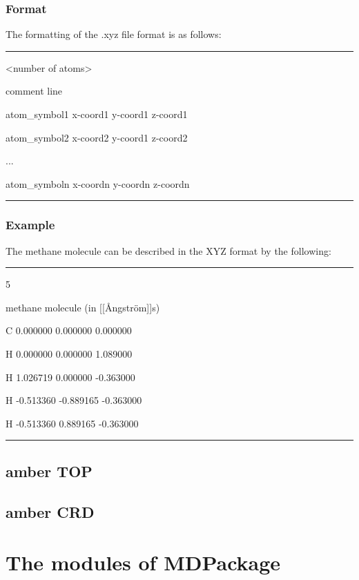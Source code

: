 \documentclass[letterpaper,10pt,english]{sphinxmanual}
\begin{document}
\subsection{Format}
\label{documentation_pages/file_format:format}
The formatting of the .xyz file format is as follows:


\bigskip\hrule{}\bigskip


\textless{}number of atoms\textgreater{}

comment line

atom\_symbol1 x-coord1 y-coord1 z-coord1

atom\_symbol2 x-coord2 y-coord1 z-coord2

...

atom\_symboln x-coordn y-coordn z-coordn


\bigskip\hrule{}\bigskip



\subsection{Example}
\label{documentation_pages/file_format:example}
The methane molecule can be described in the XYZ format by the following:


\bigskip\hrule{}\bigskip


5

methane molecule (in {[}{[}Ångström{]}{]}s)

C        0.000000        0.000000        0.000000

H        0.000000        0.000000        1.089000

H        1.026719        0.000000       -0.363000

H       -0.513360       -0.889165       -0.363000

H       -0.513360        0.889165       -0.363000


\bigskip\hrule{}\bigskip



\section{amber TOP}
\label{documentation_pages/file_format:amber-top}

\section{amber CRD}
\label{documentation_pages/file_format:amber-crd}

\chapter{The modules of MDPackage}
\label{documentation_pages/modules::doc}\label{documentation_pages/modules:the-modules-of-mdpackage}
\end{document}
